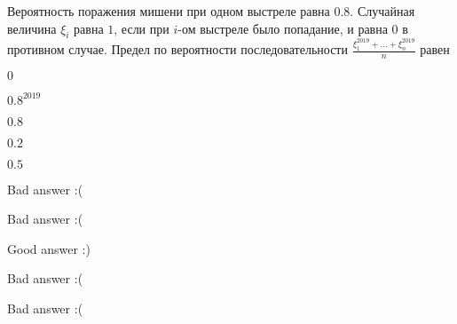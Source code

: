 
\begin{question}
Вероятность поражения мишени при одном выстреле равна \(0.8\). Случайная
величина \(\xi_i\) равна \(1\), если при \(i\)-ом выстреле было
попадание, и равна \(0\) в противном случае. Предел по вероятности
последовательности \(\frac{\xi_1^{2019} + \ldots + \xi_n^{2019}}{n}\)
равен
\begin{answerlist}
  \item \(0\)
  \item \(0.8^{2019}\)
  \item \(0.8\)
  \item \(0.2\)
  \item \(0.5\)
\end{answerlist}
\end{question}

\begin{solution}
\begin{answerlist}
  \item Bad answer :(
  \item Bad answer :(
  \item Good answer :)
  \item Bad answer :(
  \item Bad answer :(
\end{answerlist}
\end{solution}

